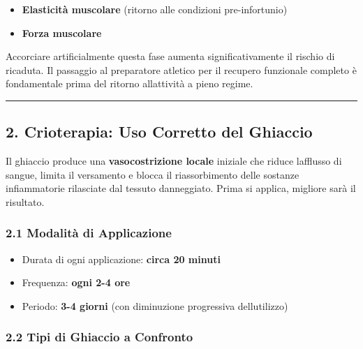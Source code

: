 \documentclass[a4paper,11pt]{article}
\providecommand{\tightlist}{%
  \setlength{\itemsep}{0pt}\setlength{\parskip}{0pt}}
\begin{document}
\begin{itemize}
      \tightlist
      \item
            \textbf{Elasticità muscolare} (ritorno alle condizioni pre-infortunio)
      \item
            \textbf{Forza muscolare}
\end{itemize}

Accorciare artificialmente questa fase aumenta significativamente il
rischio di ricaduta. Il passaggio al preparatore atletico per il
recupero funzionale completo è fondamentale prima del ritorno
all\textquotesingle attività a pieno regime.

\begin{center}\rule{0.5\linewidth}{0.5pt}\end{center}

\subsection{2. Crioterapia: Uso Corretto del
      Ghiaccio}\label{crioterapia-uso-corretto-del-ghiaccio}

Il ghiaccio produce una \textbf{vasocostrizione locale} iniziale che
riduce l\textquotesingle afflusso di sangue, limita il versamento e
blocca il riassorbimento delle sostanze infiammatorie rilasciate dal
tessuto danneggiato. Prima si applica, migliore sarà il risultato.

\subsubsection{2.1 Modalità di
      Applicazione}\label{modalituxe0-di-applicazione}

\begin{itemize}
      \tightlist
      \item
            Durata di ogni applicazione: \textbf{circa 20 minuti}
      \item
            Frequenza: \textbf{ogni 2-4 ore}
      \item
            Periodo: \textbf{3-4 giorni} (con diminuzione progressiva
            dell\textquotesingle utilizzo)
\end{itemize}

\subsubsection{2.2 Tipi di Ghiaccio a
      Confronto}\label{tipi-di-ghiaccio-a-confronto}
\end{document}
